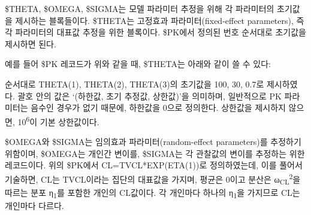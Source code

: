\documentclass[
  11pt,
  krantz2, a4paper, twoside]{krantz}
\newenvironment{Shaded}{\begin{snugshade}}{\end{snugshade}}
\newcommand{\DataTypeTok}[1]{\textcolor[rgb]{0.13,0.29,0.53}{#1}}
\newcommand{\DecValTok}[1]{\textcolor[rgb]{0.00,0.00,0.81}{#1}}
\newcommand{\FloatTok}[1]{\textcolor[rgb]{0.00,0.00,0.81}{#1}}
\newcommand{\KeywordTok}[1]{\textcolor[rgb]{0.13,0.29,0.53}{\textbf{#1}}}
\newcommand{\NormalTok}[1]{#1}
\theoremstyle{definition}
\theoremstyle{definition}
\theoremstyle{definition}
\theoremstyle{remark}
\begin{document}

\$THETA, \$OMEGA, \$SIGMA는 모델 파라미터 추정을 위해 각 파라미터의 초기값을 제시하는 블록들이다. \$THETA는 고정효과 파라미터(fixed-effect parameters), 즉 각 파라미터의 대표값 추정을 위한 블록이다. \$PK에서 정의된 번호 순서대로 초기값을 제시하면 된다.

\begin{Shaded}
\end{Shaded}

예를 들어 \$PK 레코드가 위와 같을 때, \$THETA는 아래와 같이 쓸 수 있다:

\begin{Shaded}
\end{Shaded}

순서대로 THETA(1), THETA(2), THETA(3)의 초기값을 100, 30, 0.7로 제시하였다. 괄호 안의 값은 `(하한값, 초기 추정값, 상한값)'을 의미하며, 일반적으로 PK 파라미터는 음수인 경우가 없기 때문에, 하한값을 0으로 정의한다. 상한값을 제시하지 않으면, 10\textsuperscript{6}이 기본 상한값이다.

\$OMEGA와 \$SIGMA는 임의효과 파라미터(random-effect parameters)를 추정하기 위함이며, \$OMEGA는 개인간 변이를, \$SIGMA는 각 관찰값의 변이를 추정하는 위한 레코드이다. 위의 \$PK에서 CL=TVCL*EXP(ETA(1))로 정의하였는데, 이를 풀어서 기술하면, CL는 TVCL이라는 집단의 대표값을 가지며, 평균은 0이고 분산은 ω\textsubscript{CL}\textsuperscript{2}을 따르는 분포 η\textsubscript{1}를 포함한 개인의 CL값이다. 각 개인마다 하나의 η\textsubscript{1}을 가지므로 CL는 개인마다 다르다.
\end{document}
